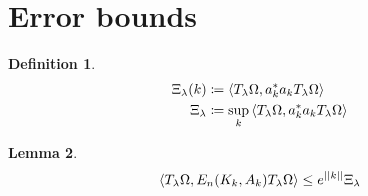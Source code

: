 \documentclass[sn-mathphys,Numbered]{sn-jnl}%
\theoremstyle{plain}
\newtheorem{theorem}{Theorem}[section]
\newtheorem{lemma}[theorem]{Lemma}
\newtheorem{proposition}[theorem]{Proposition}
\theoremstyle{definition}
\newtheorem{definition}[theorem]{Definition}
\newtheorem{example}[theorem]{Example}
\theoremstyle{remark}
\newtheorem{remark}[theorem]{Remark}
\theoremstyle{plain}
\theoremstyle{definition}
\theoremstyle{remark}
\begin{document}








\section{Error bounds}
\begin{definition}
    \begin{align}
        \Xi_\lambda(k) &\coloneq \expval{T_\lambda\Omega, a^*_ka_kT_\lambda\Omega}\\
        \Xi_\lambda &\coloneq \sup\limits_{k}\expval{T_\lambda\Omega, a^*_ka_kT_\lambda\Omega}
    \end{align}
\end{definition}
\begin{lemma}
    \begin{equation}
    \expval{T_\lambda\Omega, E_n(K_k,A_k)T_\lambda\Omega}\leq e^{||k||} \Xi_\lambda  
    \end{equation}
    
\end{lemma}






\end{document}
